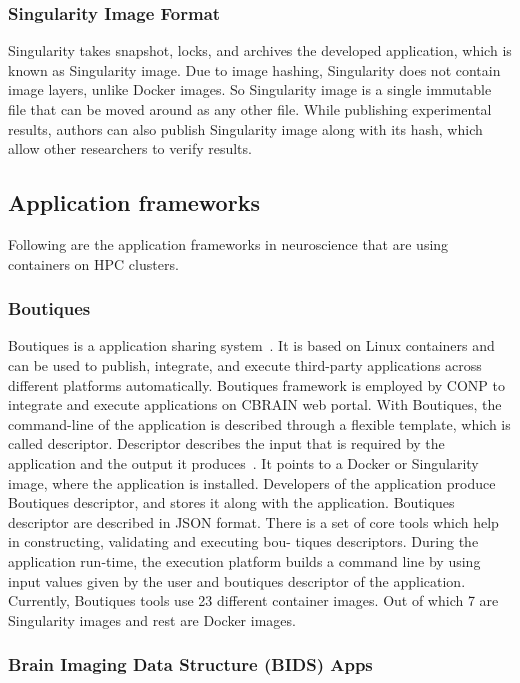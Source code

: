 \documentclass[a4paper,num-refs]{oup-contemporary}
\begin{document}
\subsubsection{Singularity Image Format}

Singularity takes snapshot, locks, and archives the developed application, which
is known as Singularity image. Due to image hashing, Singularity does not
contain image layers, unlike Docker images. So Singularity image is a single
immutable file that can be moved around as any other file. While publishing experimental
results, authors can also publish Singularity image along with its hash, which
allow other researchers to verify results.

\subsection{Application frameworks}

Following are the application frameworks in neuroscience that are using containers
on HPC clusters.

\subsubsection{Boutiques}

Boutiques is a application sharing system~\cite{glatard2015boutiques}. It is based on Linux containers
and can be used to publish, integrate, and execute third-party
applications across different platforms automatically. Boutiques framework is
employed by CONP to integrate and execute applications on CBRAIN web portal.
With Boutiques, the command-line of the application is
described through a flexible template, which is called descriptor. Descriptor
describes the input that is required by the application and the output it produces~\cite{glatard2018boutiques}.
It points to a Docker or Singularity image, where the application is installed.
Developers of the application produce Boutiques descriptor, and stores it along
with the application. Boutiques descriptor are described in JSON format. There
is a set of core tools which help in constructing, validating and executing bou-
tiques descriptors. During the application run-time, the execution platform
builds a command line by using input values given by the user and boutiques
descriptor of the application.
Currently, Boutiques tools use 23 different container images. Out of
which 7 are Singularity images and rest are Docker images.

\subsubsection{Brain Imaging Data Structure (BIDS) Apps}
\end{document}
